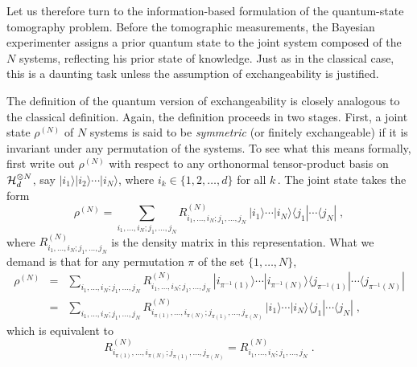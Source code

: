 Let us therefore turn to the information-based formulation of the
quantum-state tomography problem. Before the tomographic
measurements, the Bayesian experimenter assigns a prior quantum
state to the joint system composed of the $N$ systems, reflecting
his prior state of knowledge.  Just as in the classical case, this
is a daunting task unless the assumption of exchangeability is
justified.

The definition of the quantum version of exchangeability is
closely analogous to the classical definition.  Again, the
definition proceeds in two stages.  First, a joint state
$\rho^{(N)}$ of $N$ systems is said to be {\it symmetric\/} (or
finitely exchangeable) if it is invariant under any permutation of
the systems.  To see what this means formally, first write out
$\rho^{(N)}$ with respect to any orthonormal tensor-product basis
on ${\cal H}_d^{\otimes N}$, say
$|i_1\rangle|i_2\rangle\cdots|i_N\rangle$, where
$i_k\in\{1,2,\ldots,d\}$ for all $k\,$.  The joint state takes the
form
\begin{equation}
\rho^{(N)}=\sum_{i_1,\ldots,i_N;j_1,\ldots,j_N}
R^{(N)}_{i_1,\ldots,i_N;j_1,\ldots,j_N}\,
|i_1\rangle\cdots|i_N\rangle \langle j_1| \cdots\langle j_N|\;,
\end{equation}
where $R^{(N)}_{i_1,\ldots,i_N;j_1,\ldots,j_N}$ is the density
matrix in this representation.  What we demand is that for any
permutation $\pi$ of the set $\{1,\ldots,N\}$,
\begin{eqnarray}
\rho^{(N)}&=&\sum_{i_1,\ldots,i_N;j_1,\ldots,j_N}
R^{(N)}_{i_1,\ldots,i_N;j_1,\ldots,j_N}\,
|i_{\pi^{-1}(1)}\rangle\cdots|i_{\pi^{-1}(N)}\rangle
\langle j_{\pi^{-1}(1)}|\cdots\langle j_{\pi^{-1}(N)}|\nonumber\\
&=&\sum_{i_1,\ldots,i_N;j_1,\ldots,j_N}
R^{(N)}_{i_{\pi(1)},\ldots,i_{\pi(N)};j_{\pi(1)},\ldots,j_{\pi(N)}}\,
|i_1\rangle\cdots|i_N\rangle \langle j_1| \cdots\langle j_N|
\;,
\end{eqnarray}
which is equivalent to
\begin{equation}
R^{(N)}_{i_{\pi(1)},\ldots,i_{\pi(N)};j_{\pi(1)},\ldots,j_{\pi(N)}}
=R^{(N)}_{i_1,\ldots,i_N;j_1,\ldots,j_N}\;.
\end{equation}

